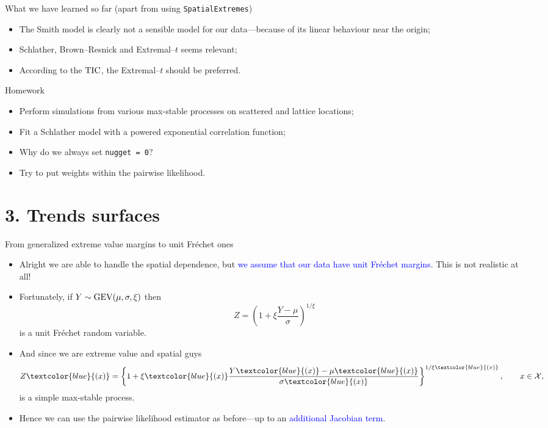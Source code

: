 \documentclass[blackslide,style=simple]{powerdot}
\theoremstyle{plain}%
\theoremstyle{definition}
\theoremstyle{remark}
\begin{document}
\begin{slide}[toc=Debrief \#2]{What we have learned so far (apart from
    using \texttt{SpatialExtremes})}
  \begin{itemize}
  \item The Smith model is clearly not a sensible model for our
    data---because of its linear behaviour near the origin;
  \item Schlather, Brown--Resnick and Extremal--$t$ seems relevant;
  \item According to the ${\rm TIC}$, the Extremal--$t$ should be
    preferred.
  \end{itemize}  
\end{slide}

\begin{slide}[method=direct]{Homework}
  \begin{itemize}
  \item Perform simulations from various max-stable processes on
    scattered and lattice locations;
  \item Fit a Schlather model with a powered exponential correlation
    function;
  \item Why do we always set \verb|nugget = 0|?
  \item Try to put weights within the pairwise likelihood.
  \end{itemize}
\end{slide}

\section{3. Trends surfaces}

\begin{slide}[toc=]{From generalized extreme value margins to unit
    Fréchet ones}
  \begin{itemize}
  \item Alright we are able to handle the spatial dependence, but
    \textcolor{blue}{we assume that our data have unit Fréchet
      margins}. This is not realistic at all!
  \item Fortunately, if $Y \sim {\rm GEV}(\mu, \sigma, \xi)$ then
    \begin{equation*}
      Z = \left(1 + \xi \frac{Y - \mu}{\sigma} \right)^{1 / \xi}
    \end{equation*}
    is a unit Fréchet random variable.
    \pause
  \item And since we are extreme value and spatial guys
    \begin{equation*}
      Z\textcolor{blue}{(x)} = \left\{1 + \xi\textcolor{blue}{(x)}
        \frac{Y\textcolor{blue}{(x)} -
          \mu\textcolor{blue}{(x)}}{\sigma\textcolor{blue}{(x)}}
      \right\}^{1 / \xi\textcolor{blue}{(x)}}, \qquad x \in \mathcal{X},
    \end{equation*}
    is a simple max-stable process.
  \item Hence we can use the pairwise likelihood estimator as
    before---up to an \textcolor{blue}{additional Jacobian term}.
  \end{itemize}
\end{slide}
\end{document}
